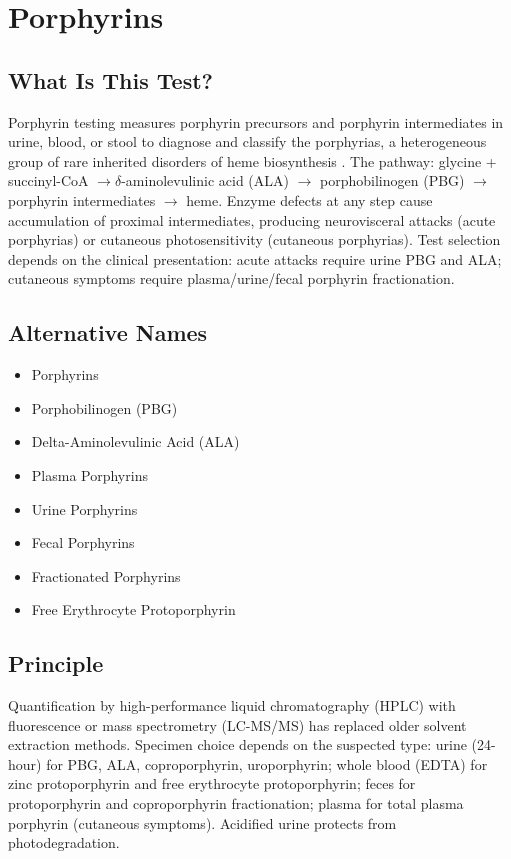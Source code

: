 \chapter{Porphyrins}

\section*{What Is This Test?}
Porphyrin testing measures porphyrin precursors and porphyrin intermediates in urine, blood, or stool to diagnose and classify the porphyrias, a heterogeneous group of rare inherited disorders of heme biosynthesis \cite{bissell2017porphyria}. The pathway: glycine + succinyl-CoA $\rightarrow \delta$-aminolevulinic acid (ALA) $\rightarrow$ porphobilinogen (PBG) $\rightarrow$ porphyrin intermediates $\rightarrow$ heme. Enzyme defects at any step cause accumulation of proximal intermediates, producing neurovisceral attacks (acute porphyrias) or cutaneous photosensitivity (cutaneous porphyrias). Test selection depends on the clinical presentation: acute attacks require urine PBG and ALA; cutaneous symptoms require plasma/urine/fecal porphyrin fractionation.

\section*{Alternative Names}
\begin{itemize}
  \item Porphyrins
  \item Porphobilinogen (PBG)
  \item Delta-Aminolevulinic Acid (ALA)
  \item Plasma Porphyrins
  \item Urine Porphyrins
  \item Fecal Porphyrins
  \item Fractionated Porphyrins
  \item Free Erythrocyte Protoporphyrin
\end{itemize}
\section*{Principle}
Quantification by high-performance liquid chromatography (HPLC) with fluorescence or mass spectrometry (LC-MS/MS) has replaced older solvent extraction methods. Specimen choice depends on the suspected type: urine (24-hour) for PBG, ALA, coproporphyrin, uroporphyrin; whole blood (EDTA) for zinc protoporphyrin and free erythrocyte protoporphyrin; feces for protoporphyrin and coproporphyrin fractionation; plasma for total plasma porphyrin (cutaneous symptoms). Acidified urine protects from photodegradation.

